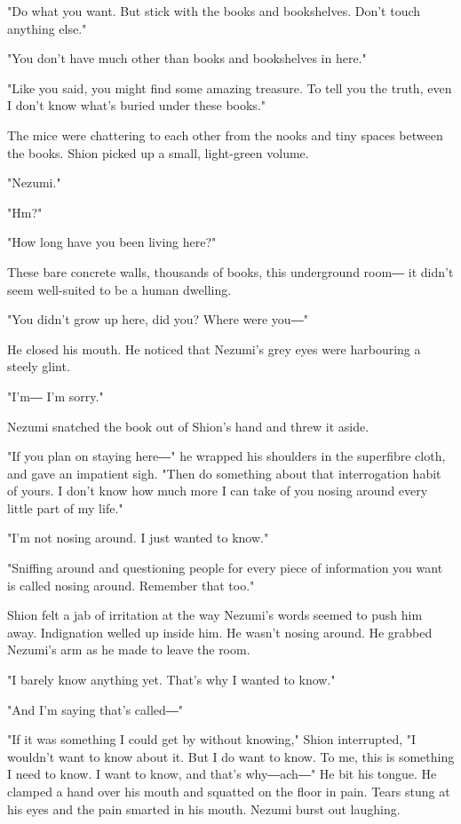 "Do what you want. But stick with the books and bookshelves. Don't touch
anything else."

"You don't have much other than books and bookshelves in here."

"Like you said, you might find some amazing treasure. To tell you the
truth, even I don't know what's buried under these books."

The mice were chattering to each other from the nooks and tiny spaces
between the books. Shion picked up a small, light-green volume.

"Nezumi."

"Hm?"

"How long have you been living here?"

These bare concrete walls, thousands of books, this underground room― it
didn't seem well-suited to be a human dwelling.

"You didn't grow up here, did you? Where were you―"

He closed his mouth. He noticed that Nezumi's grey eyes were harbouring
a steely glint.

"I'm― I'm sorry."

Nezumi snatched the book out of Shion's hand and threw it aside.

"If you plan on staying here―" he wrapped his shoulders in the
superfibre cloth, and gave an impatient sigh. "Then do something about
that interrogation habit of yours. I don't know how much more I can take
of you nosing around every little part of my life."

"I'm not nosing around. I just wanted to know."

"Sniffing around and questioning people for every piece of information
you want is called nosing around. Remember that too."

Shion felt a jab of irritation at the way Nezumi's words seemed to push
him away. Indignation welled up inside him. He wasn't nosing around. He
grabbed Nezumi's arm as he made to leave the room.

"I barely know anything yet. That's why I wanted to know."

"And I'm saying that's called―"

"If it was something I could get by without knowing," Shion interrupted,
"I wouldn't want to know about it. But I do want to know. To me, this is
something I need to know. I want to know, and that's why―ach―" He bit
his tongue. He clamped a hand over his mouth and squatted on the floor
in pain. Tears stung at his eyes and the pain smarted in his mouth.
Nezumi burst out laughing.

